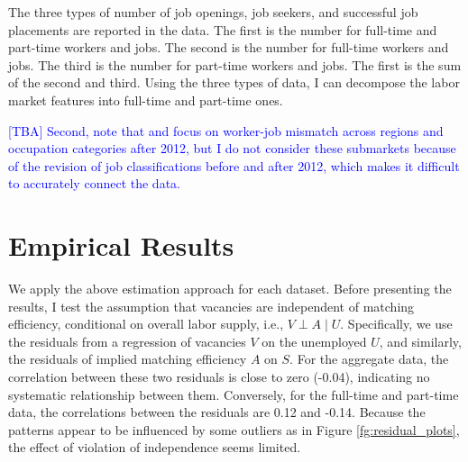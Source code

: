 \documentclass[12pt]{article}
\begin{document}
The three types of number of job openings, job seekers, and successful job placements are reported in the data. 
The first is the number for full-time and part-time workers and jobs.
The second is the number for full-time workers and jobs.
The third is the number for part-time workers and jobs.
The first is the sum of the second and third.
Using the three types of data, I can decompose the labor market features into full-time and part-time ones.

\textcolor{blue}{[TBA] Second, note that \cite{kawata2019} and \cite{higashi2018spatial} focus on worker-job mismatch across regions and occupation categories after 2012, but I do not consider these submarkets because of the revision of job classifications before and after 2012, which makes it difficult to accurately connect the data.}





\section{Empirical Results}
We apply the above estimation approach for each dataset.
Before presenting the results, I test the assumption that vacancies are independent of matching efficiency, conditional on overall labor supply, i.e., \( V \perp A \mid U \). 
Specifically, we use the residuals from a regression of vacancies \( V \) on the unemployed \( U \), and similarly, the residuals of implied matching efficiency \( A \) on \( S \).
For the aggregate data, the correlation between these two residuals is close to zero (-0.04), indicating no systematic relationship between them.
Conversely, for the full-time and part-time data, the correlations between the residuals are 0.12 and -0.14.
Because the patterns appear to be influenced by some outliers as in Figure \ref{fg:residual_plots}, the effect of violation of independence seems limited.
\end{document}
